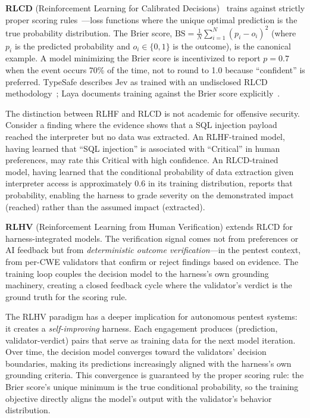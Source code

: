 \documentclass[conference]{IEEEtran}
\begin{document}
\textbf{RLCD} (Reinforcement Learning for Calibrated Decisions)~\cite{typesafe2026docs,laya2026} trains against strictly proper scoring rules~\cite{gneiting2007strictly}---loss functions where the unique optimal prediction is the true probability distribution. The Brier score, $\mathrm{BS} = \frac{1}{N}\sum_{i=1}^{N}(p_i - o_i)^2$ (where $p_i$ is the predicted probability and $o_i \in \{0,1\}$ is the outcome), is the canonical example. A model minimizing the Brier score is incentivized to report $p = 0.7$ when the event occurs 70\% of the time, not to round to 1.0 because ``confident'' is preferred. TypeSafe describes Jev as trained with an undisclosed RLCD methodology~\cite{typesafe2026docs}; Laya documents training against the Brier score explicitly~\cite{laya2026}.

The distinction between RLHF and RLCD is not academic for offensive security. Consider a finding where the evidence shows that a SQL injection payload reached the interpreter but no data was extracted. An RLHF-trained model, having learned that ``SQL injection'' is associated with ``Critical'' in human preferences, may rate this Critical with high confidence. An RLCD-trained model, having learned that the conditional probability of data extraction given interpreter access is approximately 0.6 in its training distribution, reports that probability, enabling the harness to grade severity on the demonstrated impact (reached) rather than the assumed impact (extracted).

\textbf{RLHV} (Reinforcement Learning from Human Verification) extends RLCD for harness-integrated models. The verification signal comes not from preferences or AI feedback but from \emph{deterministic outcome verification}---in the pentest context, from per-CWE validators that confirm or reject findings based on evidence. The training loop couples the decision model to the harness's own grounding machinery, creating a closed feedback cycle where the validator's verdict is the ground truth for the scoring rule.

The RLHV paradigm has a deeper implication for autonomous pentest systems: it creates a \emph{self-improving} harness. Each engagement produces (prediction, validator-verdict) pairs that serve as training data for the next model iteration. Over time, the decision model converges toward the validators' decision boundaries, making its predictions increasingly aligned with the harness's own grounding criteria. This convergence is guaranteed by the proper scoring rule: the Brier score's unique minimum is the true conditional probability, so the training objective directly aligns the model's output with the validator's behavior distribution.
\end{document}
